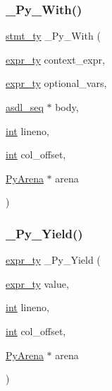 \mbox{\label{_python-ast_8h_abd123e9dd4c50b67b73c8f676ff74315}} 
\subsubsection{\texorpdfstring{\_Py\_With()}{\_Py\_With()}}
{\footnotesize\ttfamily \mbox{\hyperlink{_python-ast_8h_a39618071027b661bc03e8916e664e1a7}{stmt\+\_\+ty}} \+\_\+\+Py\+\_\+\+With (\begin{DoxyParamCaption}\item[{\mbox{\hyperlink{_python-ast_8h_a56d3705e020a071405094a220c4592bd}{expr\+\_\+ty}}}]{context\+\_\+expr,  }\item[{\mbox{\hyperlink{_python-ast_8h_a56d3705e020a071405094a220c4592bd}{expr\+\_\+ty}}}]{optional\+\_\+vars,  }\item[{\mbox{\hyperlink{structasdl__seq}{asdl\+\_\+seq}} $\ast$}]{body,  }\item[{\mbox{\hyperlink{warnings_8h_a74f207b5aa4ba51c3a2ad59b219a423b}{int}}}]{lineno,  }\item[{\mbox{\hyperlink{warnings_8h_a74f207b5aa4ba51c3a2ad59b219a423b}{int}}}]{col\+\_\+offset,  }\item[{\mbox{\hyperlink{pyarena_8h_a9edeb357fbb27333471022a0975adb7a}{Py\+Arena}} $\ast$}]{arena }\end{DoxyParamCaption})}

\mbox{\label{_python-ast_8h_aef15cd5d48730f2c5f4215d2cfc170df}} 
\subsubsection{\texorpdfstring{\_Py\_Yield()}{\_Py\_Yield()}}
{\footnotesize\ttfamily \mbox{\hyperlink{_python-ast_8h_a56d3705e020a071405094a220c4592bd}{expr\+\_\+ty}} \+\_\+\+Py\+\_\+\+Yield (\begin{DoxyParamCaption}\item[{\mbox{\hyperlink{_python-ast_8h_a56d3705e020a071405094a220c4592bd}{expr\+\_\+ty}}}]{value,  }\item[{\mbox{\hyperlink{warnings_8h_a74f207b5aa4ba51c3a2ad59b219a423b}{int}}}]{lineno,  }\item[{\mbox{\hyperlink{warnings_8h_a74f207b5aa4ba51c3a2ad59b219a423b}{int}}}]{col\+\_\+offset,  }\item[{\mbox{\hyperlink{pyarena_8h_a9edeb357fbb27333471022a0975adb7a}{Py\+Arena}} $\ast$}]{arena }\end{DoxyParamCaption})}

